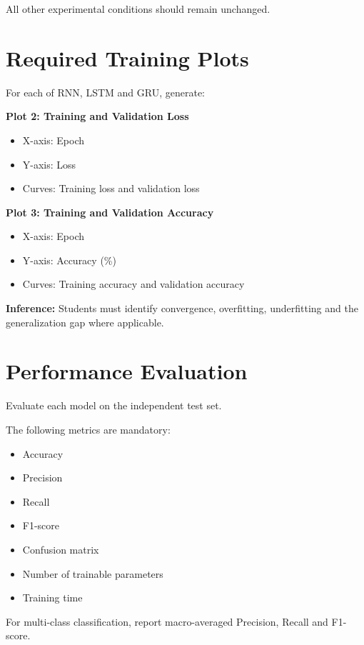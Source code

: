\documentclass[10pt]{article}
\begin{document}
All other experimental conditions should remain unchanged.

\section{Required Training Plots}

For each of RNN, LSTM and GRU, generate:

\textbf{Plot 2: Training and Validation Loss}

\begin{itemize}
\item X-axis: Epoch
\item Y-axis: Loss
\item Curves: Training loss and validation loss
\end{itemize}

\textbf{Plot 3: Training and Validation Accuracy}

\begin{itemize}
\item X-axis: Epoch
\item Y-axis: Accuracy (\%)
\item Curves: Training accuracy and validation accuracy
\end{itemize}

\textbf{Inference:} Students must identify convergence, overfitting,
underfitting and the generalization gap where applicable.

\section{Performance Evaluation}

Evaluate each model on the independent test set.

The following metrics are mandatory:

\begin{itemize}
\item Accuracy
\item Precision
\item Recall
\item F1-score
\item Confusion matrix
\item Number of trainable parameters
\item Training time
\end{itemize}

For multi-class classification, report macro-averaged Precision, Recall and
F1-score.
\end{document}
